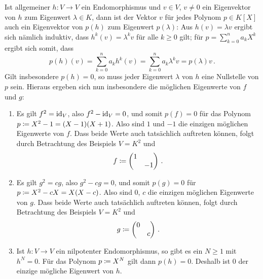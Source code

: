 \section{}





\subsection{}

Ist allgemeiner $h \colon V \to V$ ein Endomorphismus und $v \in V$, $v \neq 0$ ein Eigenvektor von $h$ zum Eigenwert $\lambda \in K$, dann ist der Vektor $v$ für jedes Polynom $p \in K[X]$ auch ein Eigenvektor von $p(h)$ zum Eigenwert $p(\lambda)$:
Aus $h(v) = \lambda v$ ergibt sich nämlich induktiv, dass $h^k(v) = \lambda^k v$ für alle $k \geq 0$ gilt;
für $p = \sum_{k=0}^n a_k X^k$ ergibt sich somit, dass
\[
    p(h)(v)
  = \sum_{k=0}^n a_k h^k(v)
  = \sum_{k=0}^n a_k \lambda^k v
  = p(\lambda) v \,.
\]
Gilt insbesondere $p(h) = 0$, so muss jeder Eigenwert $\lambda$ von $h$ eine Nullstelle von $p$ sein. 
Hieraus ergeben sich nun insbesondere die möglichen Eigenwerte von $f$ und $g$:

\begin{example}
  \leavevmode
  \begin{enumerate}
    \item
      Es gilt $f^2 = \operatorname{id}_V$, also $f^2 - \operatorname{id}_V = 0$, und somit $p(f) = 0$ für das Polynom $p \coloneqq X^2 - 1 = (X-1)(X+1)$.
      Also sind $1$ und $-1$ die einzigen möglichen Eigenwerte von $f$.
      Dass beide Werte auch tatsächlich auftreten können, folgt durch Betrachtung des Beispiels $V = K^2$ und
      \[
                  f
        \coloneqq  \begin{pmatrix}
                    1 &     \\
                      & -1
                  \end{pmatrix} \,.
      \]
    \item
      Es gilt $g^2 = cg$, also $g^2 - cg = 0$, und somit $p(g) = 0$ für $p \coloneqq X^2 - cX = X(X-c)$.
      Also sind $0$, $c$ die einzigen möglichen Eigenwerte von $g$.
      Dass beide Werte auch tatsächlich auftreten können, folgt durch Betrachtung des Beispiels $V = K^2$ und
      \[
                  g
        \coloneqq  \begin{pmatrix}
                    0 &   \\
                      & c
                  \end{pmatrix} \,.
      \]
    \item
      Ist $h \colon V \to V$ ein nilpotenter Endomorphismus, so gibt es ein $N \geq 1$ mit $h^N = 0$.
      Für das Polynom $p \coloneqq X^N$ gilt dann $p(h) = 0$.
      Deshalb ist $0$ der einzige mögliche Eigenwert von $h$.
  \end{enumerate}
\end{example}





